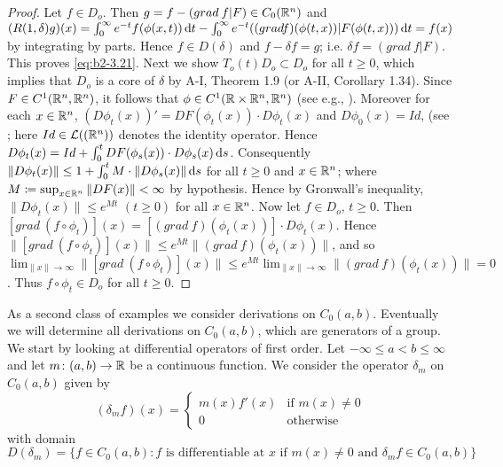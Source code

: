 \begin{proof}
Let $f \in D_{o}$.
Then $g = f - (grad\: f | F) \in C_{0}(\mathbb{R}^{n})$ and
$(R(1,\delta)g)(x) = \int_{0}^{\infty} e^{-t}f(\phi(x,t)) \mathop{}\!\mathrm{d}{t} - \int_{0}^{\infty} e^{-t}((gradf)(\phi(t,x)) | F(\phi(t,x))) \mathop{}\!\mathrm{d}{t} = f(x)$ by integrating by parts.
Hence $f \in D(\delta)$ and $f - \delta f = g$; i.e. $\delta f = (grad\: f|F)$.
This proves \eqref{eq:b2-3.21}.
Next we show $T_{o}(t)D_{o} \subset D_{o}$ for all $t \geq 0$, which implies that $D_{o}$ is a core of $\delta$ by A-I, Theorem 1.9 (or A-II, Corollary 1.34). 
Since $F \in C^{1}(\mathbb{R}^{n},\mathbb{R}^{n})$, it follows that $\phi \in C^{1}(\mathbb{R} \times \mathbb{R}^{n},\mathbb{R}^{n})$ (see e.g., \citet[15.2]{hirschsmale:1974}).
Moreover for each $x \in \mathbb{R}^{n}$, $(D\phi_{t}(x))' = DF(\phi_{t}(x)) \cdot D\phi_{t}(x)$ and $D\phi_{0}(x) = Id$, (see \citet[p. 300]{hirschsmale:1974}; here $Id \in \mathcal{L}((\mathbb{R}^{n}))$ denotes the identity operator.
Hence $D\phi_{t}(x) = Id + \int_{0}^{t} DF(\phi_{s}(x)) \cdot D\phi_{s}(x) \mathop{}\!\mathrm{d}{s}$.
Consequently $\|D\phi_{t}(x)\| \leq 1 + \int_{0}^{t}  M \cdot  \|D\phi_{s}(x)\| \mathop{}\!\mathrm{d}{s}$ for all $t \geq 0$ and $x \in \mathbb{R}^{n}$; where $M \coloneqq \sup_{x \in \mathbb{R}^{n}} \|DF(x)\| < \infty$ by hypothesis.
Hence by Gronwall's inequality, $\|D\phi_{t}(x)\| \leq e^{Mt}$ $(t \geq 0)$ for all $x \in \mathbb{R}^{n}$.
Now let $f \in D_{o}$, $t \geq 0$.
Then $[grad\:(f \circ \phi_{t})](x) = [(grad\:f)(\phi_{t}(x))] \cdot D\phi_{t}(x)$.
Hence $\|[grad\:(f \circ \phi_{t})](x)\| \leq e^{Mt}\|(grad\:f)(\phi_{t}(x))\|$, and so $\lim_{\|x\| \to \infty} \|[grad\:(f \circ \phi_{t})](x)\| \leq e^{Mt} \lim_{\|x\| \to \infty} \|(grad\:f)(\phi_{t}(x))\| = 0$.
Thus $f \circ \phi_{t} \in D_{o}$ for all $t \geq 0$.
\end{proof}
As a second class of examples we consider derivations on $C_{0}(a,b)$.
Eventually we will determine all derivations on $C_{0}(a,b)$, which are generators of a group.
We start by looking at differential operators of first order.
Let $-\infty \leq a < b \leq \infty$ and let $m \colon (a,b) \to \mathbb{R}$ be a continuous function.
We consider the operator $\delta_{m}$ on $C_{0}(a,b)$ given by
\begin{equation*}\label{eq:b2-delta-m}
(\delta_{m}f)(x) = \begin{cases}
    m(x)f'(x) & \text{if } m(x) \neq 0 \\
    0 & \text{otherwise}
\end{cases}
\end{equation*}
with domain \\ 
$D(\delta_{m}) = \{ f \in C_{0}(a,b) \colon f \text{ is differentiable at } x \text{ if } m(x) \neq 0 \text{ and } \delta_{m}f \in C_{0}(a,b) \}$ \\
